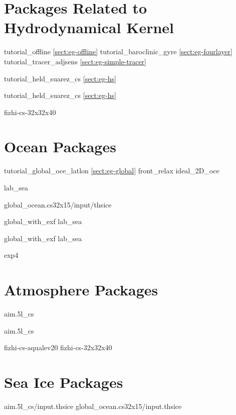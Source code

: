 \newpage


\newpage
\section{Packages Related to Hydrodynamical Kernel}

tutorial\_offline               \ref{sect:eg-offline}
tutorial\_baroclinic\_gyre      \ref{sect:eg-fourlayer}
tutorial\_tracer\_adjsens       \ref{sect:eg-simple-tracer}

\newpage

tutorial\_held\_suarez\_cs    \ref{sect:eg-hs}

\newpage

tutorial\_held\_suarez\_cs   \ref{sect:eg-hs}

\newpage

fizhi-cs-32x32x40


\newpage
\section{Ocean Packages}

tutorial\_global\_oce\_latlon    \ref{sect:eg-global}
front\_relax
ideal\_2D\_oce

\newpage

lab\_sea

\newpage

global\_ocean.cs32x15/input/thsice

\newpage

global\_with\_exf
lab\_sea

\newpage

global\_with\_exf
lab\_sea

\newpage

exp4

\section{Atmosphere Packages}
\newpage

aim.5l\_cs

\newpage

aim.5l\_cs

\newpage

fizhi-cs-aqualev20
fizhi-cs-32x32x40

\section{Sea Ice Packages}
\newpage

aim.5l\_cs/input.thsice
global\_ocean.cs32x15/input.thsice

